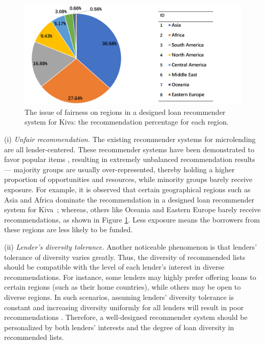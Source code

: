 \begin{figure}
\includegraphics[width=0.98\columnwidth]{imgs/far/kiva.png}
\caption{The issue of fairness on regions in a designed loan recommender system \cite{choo2014gather} for Kiva: the recommendation percentage for each region.}
\label{fig:recom_result}
\end{figure}


(i) \textit{Unfair recommendation.} The existing recommender systems for microlending are all lender-centered. These recommender systems have been demonstrated to favor popular items \cite{celma2008hits,lee2014fairness}, resulting in extremely unbalanced recommendation results --- majority groups are usually over-represented, thereby holding a higher proportion of opportunities and resources, while minority groups barely receive exposure. For example, it is observed that certain geographical regions such as Asia and Africa dominate the recommendation in a designed loan recommender system for Kiva~\cite{choo2014gather}; whereas, others like Oceania and Eastern Europe barely receive recommendations, as shown in Figure \ref{fig:recom_result}. Less exposure means the borrowers from these regions are less likely to be funded.


(ii) \textit{Lender's diversity tolerance.} Another noticeable phenomenon is that lenders' tolerance of diversity varies greatly.  Thus, the diversity of recommended lists should be compatible with the level of each lender's interest in diverse recommendations. For instance, some lenders may highly prefer offering loans to certain regions (such as their home countries), while others may be open to diverse regions. In such scenarios, assuming lenders' diversity tolerance is constant and increasing diversity uniformly for all lenders 
will result in poor recommendations \cite{eskandanian2017clustering}. Therefore, a well-designed recommender system should be personalized by both lenders' interests and the degree of loan diversity in recommended lists.

